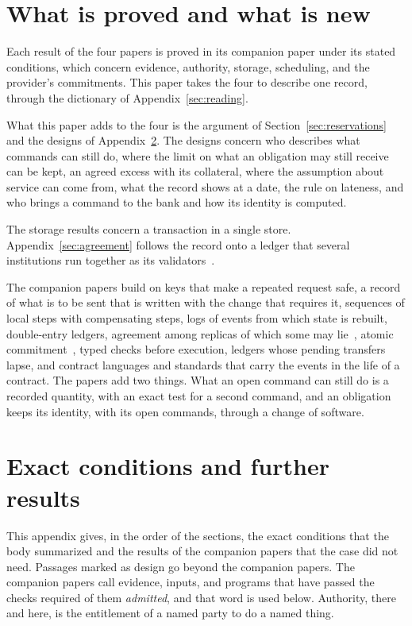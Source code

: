\documentclass{momentum}
\begin{document}
\section{What is proved and what is new}
\label{sec:limits}

Each result of the four papers is proved in its companion paper under its stated conditions, which concern evidence, authority, storage, scheduling, and the provider's commitments. This paper takes the four to describe one record, through the dictionary of Appendix~\ref{sec:reading}.

What this paper adds to the four is the argument of Section~\ref{sec:reservations} and the designs of Appendix~\ref{sec:conditions}. The designs concern who describes what commands can still do, where the limit on what an obligation may still receive can be kept, an agreed excess with its collateral, where the assumption about service can come from, what the record shows at a date, the rule on lateness, and who brings a command to the bank and how its identity is computed.

The storage results concern a transaction in a single store. Appendix~\ref{sec:agreement} follows the record onto a ledger that several institutions run together as its validators~\cite{event}.

The companion papers build on keys that make a repeated request safe, a record of what is to be sent that is written with the change that requires it, sequences of local steps with compensating steps, logs of events from which state is rebuilt, double-entry ledgers, agreement among replicas of which some may lie~\cite{lamport82}, atomic commitment~\cite{gray78}, typed checks before execution, ledgers whose pending transfers lapse, and contract languages and standards that carry the events in the life of a contract. The papers add two things. What an open command can still do is a recorded quantity, with an exact test for a second command, and an obligation keeps its identity, with its open commands, through a change of software.

\appendix

\section{Exact conditions and further results}
\label{sec:conditions}

This appendix gives, in the order of the sections, the exact conditions that the body summarized and the results of the companion papers that the case did not need. Passages marked as design go beyond the companion papers. The companion papers call evidence, inputs, and programs that have passed the checks required of them \emph{admitted}, and that word is used below. Authority, there and here, is the entitlement of a named party to do a named thing.
\end{document}
